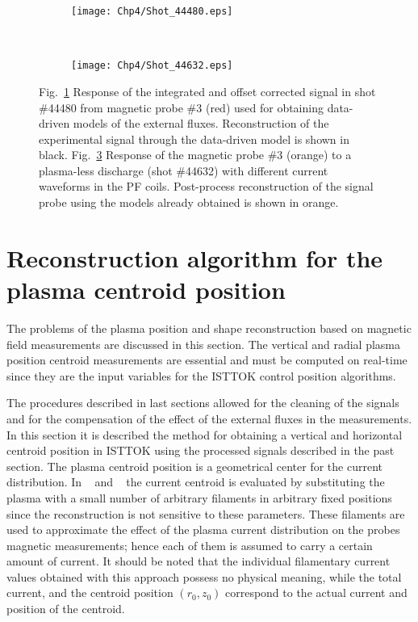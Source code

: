 \begin{figure}
	\begin{subfigure}[b]{0.47\textwidth}
		\texttt{[image: Chp4/Shot\_44480.eps]}  
		\caption{\label{fig:44480} }
	\end{subfigure}
~
	\begin{subfigure}[b]{0.47\textwidth}
		\texttt{[image: Chp4/Shot\_44632.eps]}        
		\caption{\label{fig:44632}}
	\end{subfigure}
	
	\caption{Fig.~\ref{fig:44480} Response of the integrated and offset corrected signal in shot \#44480 from magnetic probe \#3 (red) used for obtaining data-driven models of the external fluxes. Reconstruction of the experimental signal through the data-driven model is shown in black. Fig.~\ref{fig:44632} Response of the  magnetic probe \#3 (orange) to a plasma-less discharge (shot \#44632) with different current waveforms in the PF coils. Post-process reconstruction of the  signal probe using the  models already obtained   is shown in orange. }
\end{figure}


\section{Reconstruction algorithm for the plasma centroid position}

The problems of the plasma position and shape reconstruction based on magnetic field measurements are discussed in this section. The vertical and radial plasma position centroid measurements are essential and must be computed on real-time since they are the input variables for the ISTTOK control position algorithms.\smallskip

The procedures described in last sections allowed for the cleaning of the signals and for the compensation of the effect of the external fluxes in the measurements. In this section it is described the method for obtaining a vertical and horizontal centroid position in ISTTOK using the processed signals described in the past section.  The plasma centroid position  is a geometrical center for the current distribution. In ~\cite{Pironti1995} and ~\cite{Swain1982}  the current centroid is evaluated  by substituting the plasma with a small number of arbitrary filaments in arbitrary fixed positions since the reconstruction is not sensitive to these parameters. These filaments are used to approximate the effect of the plasma current distribution on the probes magnetic measurements; hence each of them is assumed to carry a certain amount of current. It should be noted that the individual filamentary current values obtained with this approach possess no physical meaning, while the total current, and the centroid position $(r_0,z_0)$ correspond to the actual current and position of the centroid.\smallskip

